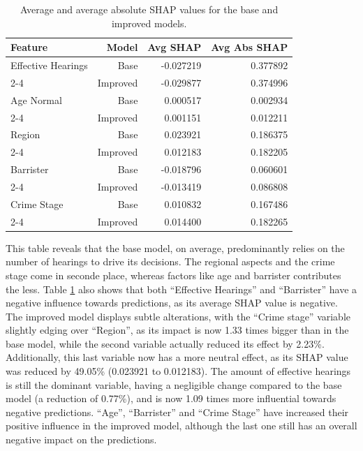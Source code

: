 \documentclass[fleqn,10pt]{wlscirep}
\begin{document}
\begin{table}[h!]
\centering
\begin{tabular}{|l|r|r|r|}
\hline
\textbf{Feature} & \textbf{Model} & \textbf{Avg SHAP} & \textbf{Avg Abs SHAP} \\ \hline
Effective Hearings & Base      & -0.027219 &  0.377892 \\ \cline{2-4}
                   & Improved  & -0.029877 &  0.374996  \\ \hline
Age Normal         & Base      &  0.000517 &  0.002934 \\ \cline{2-4}
                   & Improved  & 0.001151 &  0.012211  \\ \hline
Region             & Base      &  0.023921 &  0.186375  \\ \cline{2-4}
                   & Improved  &  0.012183 &  0.182205  \\ \hline
Barrister          & Base      & -0.018796 &  0.060601  \\ \cline{2-4}
                   & Improved  & -0.013419 &  0.086808  \\ \hline
Crime Stage        & Base      &  0.010832 &  0.167486  \\ \cline{2-4}
                   & Improved  &  0.014400 &  0.182265  \\ \hline
\end{tabular}
\caption{Average and average absolute SHAP values for the base and improved models.}
\label{tab:pt_shap_stats_base_improved}
\end{table}

This table reveals that the base model, on average, predominantly relies on the number of hearings to drive its decisions. The regional aspects and the crime stage come in seconde place, whereas factors like age and barrister contributes the less. Table \ref{tab:pt_shap_stats_base_improved} also shows that both ``Effective Hearings'' and ``Barrister'' have a negative influence towards predictions, as its average SHAP value is negative. The improved model displays subtle alterations, with the ``Crime stage'' variable slightly edging over ``Region'', as its impact is now 1.33 times bigger than in the base model, while the second variable actually reduced its effect by 2.23\%. Additionally, this last variable now has a more neutral effect, as its SHAP value was reduced by 49.05\% (0.023921 to 0.012183). The amount of effective hearings is still the dominant variable, having a negligible change compared to the base model (a reduction of 0.77\%), and is now 1.09 times more influential towards negative predictions. ``Age'', ``Barrister'' and ``Crime Stage'' have increased their positive influence in the improved model, although the last one still has an overall negative impact on the predictions.
\end{document}

